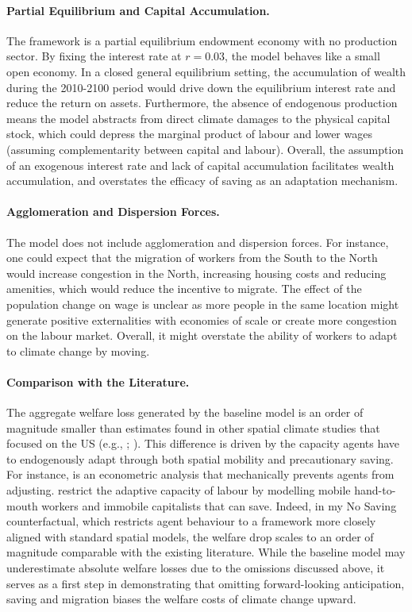 \documentclass[11pt, a4paper]{article}
\begin{document}
\paragraph{Partial Equilibrium and Capital Accumulation.}
The framework is a partial equilibrium endowment economy with no production sector. By fixing the interest rate at $r = 0.03$, the model behaves like a small open economy. In a closed general equilibrium setting, the accumulation of wealth during the 2010-2100 period would drive down the equilibrium interest rate and reduce the return on assets. Furthermore, the absence of endogenous production means the model abstracts from direct climate damages to the physical capital stock, which could depress the marginal product of labour and lower wages (assuming complementarity between capital and labour). Overall, the assumption of an exogenous interest rate and lack of capital accumulation facilitates wealth accumulation, and overstates the efficacy of saving as an adaptation mechanism.

\paragraph{Agglomeration and Dispersion Forces.}
The model does not include agglomeration and dispersion forces. For instance, one could expect that the migration of workers from the South to the North would increase congestion in the North, increasing housing costs and reducing amenities, which would reduce the incentive to migrate. The effect of the population change on wage is unclear as more people in the same location might generate positive externalities with economies of scale or create more congestion on the labour market. Overall, it might overstate the ability of workers to adapt to climate change by moving.

\paragraph{Comparison with the Literature.}
The aggregate welfare loss generated by the baseline model is an order of magnitude smaller than estimates found in other spatial climate studies that focused on the US (e.g., \citet{hsiang_estimating_2017}; \citet{bilal_anticipating_nodate}). This difference is driven by the capacity agents have to endogenously adapt through both spatial mobility and precautionary saving. For instance, \citet{hsiang_estimating_2017} is an econometric analysis that mechanically prevents agents from adjusting. \citet{bilal_anticipating_nodate} restrict the adaptive capacity of labour by modelling mobile hand-to-mouth workers and immobile capitalists that can save. Indeed, in my No Saving counterfactual, which restricts agent behaviour to a framework more closely aligned with standard spatial models, the welfare drop scales to an order of magnitude comparable with the existing literature. While the baseline model may underestimate absolute welfare losses due to the omissions discussed above, it serves as a first step in demonstrating that omitting forward-looking anticipation, saving and migration biases the welfare costs of climate change upward.
\end{document}
